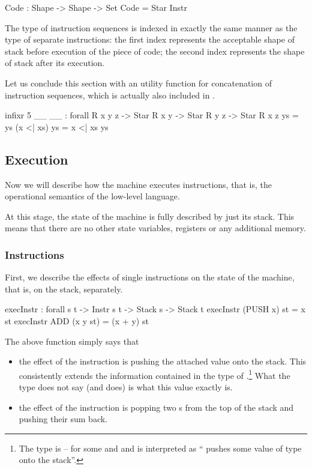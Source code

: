 \begin{code}
  Code : Shape -> Shape -> Set
  Code = Star Instr
\end{code}

\noindent The type of instruction sequences is indexed in exactly the same
manner as the type of separate instructions: the first index represents the
acceptable shape of stack before execution of the piece of code; the second
index represents the shape of stack after its execution.

Let us conclude this section with an utility function for concatenation of
instruction sequences, which is actually also included in .

\begin{code}
  infixr 5 _\app\_
  _\app\_ : forall {R x y z} -> Star R x y -> Star R y z -> Star R x z
  \nil \app ys = ys
  (x <| xs) \app ys = x <| xs \app ys
\end{code}

\subsection{Execution}

Now we will describe how the machine executes instructions, that is,
the operational semantics of the low-level language.

At this stage, the state of the machine is fully described by just its stack. This
means that there are no other state variables, registers or any additional
memory.

\subsubsection{Instructions}

First, we describe the effects of single instructions on the state of the machine,
that is, on the stack, separately.

\begin{code}
  execInstr : forall {s t} -> Instr s t -> Stack s -> Stack t
  execInstr (PUSH x) st = x \scons st
  execInstr ADD (x \scons y \scons st) = (x + y) \scons st
\end{code}

\noindent The above function simply says that
\begin{itemize}
  \item the effect of the instruction  is pushing the attached
    value onto the stack. This consistently extends the information contained
    in the type of .\footnote{The type is 
    -- for some  and  and is interpreted as ``
    pushes some value of type  onto the stack''.}
    What the type does not say (and 
    does) is what this value exactly is.
  \item the effect of the instruction  is popping two s from
    the top of the stack and pushing their sum back.
\end{itemize}

